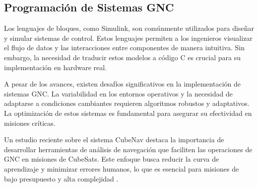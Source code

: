 \subsection{Programación de Sistemas GNC}
Los lenguajes de bloques, como Simulink, son comúnmente utilizados para diseñar y simular sistemas de control. Estos lenguajes permiten a los ingenieros visualizar 
el flujo de datos y las interacciones entre componentes de manera intuitiva. Sin embargo, la necesidad de traducir estos modelos a código C es crucial para su 
implementación en hardware real.

A pesar de los avances, existen desafíos significativos en la implementación de sistemas GNC. La variabilidad en los entornos operativos y la necesidad de adaptarse 
a condiciones cambiantes requieren algoritmos robustos y adaptativos. La optimización de estos sistemas es fundamental para asegurar su efectividad en misiones 
críticas.

Un estudio reciente sobre el sistema CubeNav destaca la importancia de desarrollar herramientas de análisis de navegación que faciliten las operaciones de GNC 
en misiones de CubeSats. Este enfoque busca reducir la curva de aprendizaje y minimizar errores humanos, lo que es esencial para misiones de bajo presupuesto 
y alta complejidad \cite{Loureno2023VerificationV}.